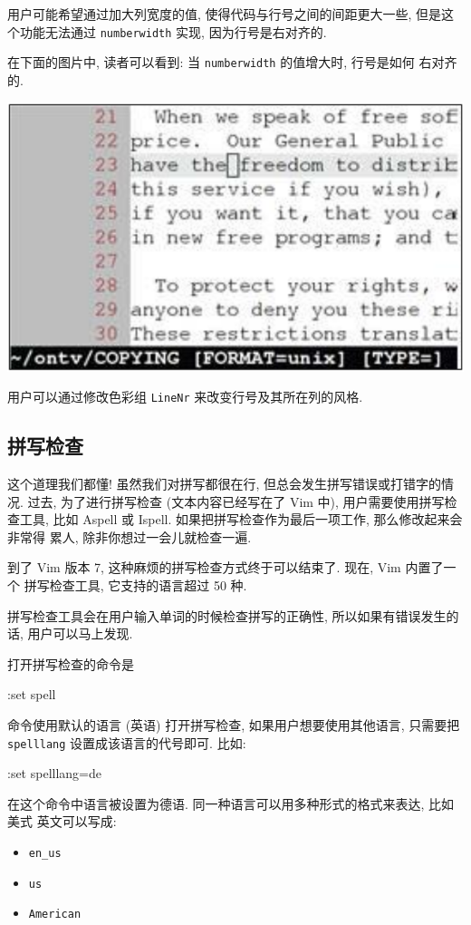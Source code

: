 \begin{warning}
\begin{warning}
    用户可能希望通过加大列宽度的值, 使得代码与行号之间的间距更大一些, 
    但是这个功能无法通过 \texttt{numberwidth} 实现, 因为行号是右对齐的.
\end{warning}

在下面的图片中, 读者可以看到: 当 \texttt{numberwidth} 的值增大时, 行号是如何
右对齐的.

\begin{center}
\includegraphics[scale=0.6]{./images/page40.png}
\end{center}

\begin{warning}
    用户可以通过修改色彩组 \texttt{LineNr} 来改变行号及其所在列的风格.
\end{warning}

\subsection{拼写检查}
\label{subsec:spell_checking_your_language}

这个道理我们都懂! 虽然我们对拼写都很在行, 但总会发生拼写错误或打错字的情况.
过去, 为了进行拼写检查 (文本内容已经写在了 Vim 中), 用户需要使用拼写检查工具,
比如 Aspell 或 Ispell. 如果把拼写检查作为最后一项工作, 那么修改起来会非常得
累人, 除非你想过一会儿就检查一遍.

到了 Vim 版本 7, 这种麻烦的拼写检查方式终于可以结束了. 现在, Vim 内置了一个
拼写检查工具, 它支持的语言超过 50 种.

拼写检查工具会在用户输入单词的时候检查拼写的正确性, 所以如果有错误发生的话,
用户可以马上发现.

打开拼写检查的命令是
\begin{vimcmd}
:set spell
\end{vimcmd}
命令使用默认的语言 (英语) 打开拼写检查, 如果用户想要使用其他语言, 只需要把 
\texttt{spelllang} 设置成该语言的代号即可. 比如:
\begin{vimcmd}
:set spelllang=de
\end{vimcmd}
在这个命令中语言被设置为德语. 同一种语言可以用多种形式的格式来表达, 比如美式
英文可以写成:
\begin{itemize}
    \item \texttt{en\_us}
    \item \texttt{us}
    \item \texttt{American}
\end{itemize}


\end{warning}
